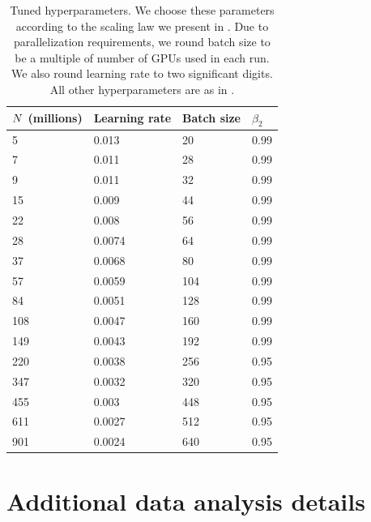 \documentclass{article}
\theoremstyle{plain}
\theoremstyle{definition}
\theoremstyle{remark}
\newcommand{\maybeSubscript}[1]{
  \ifthenelse{\equal{#1}{}}{}{_{#1}}%
}
\newcommand{\params}[1][]{N\maybeSubscript{#1}}
\begin{document}
\begin{table}
    \caption{Tuned hyperparameters. We choose these parameters according to the scaling law we present in . Due to parallelization requirements, we round batch size to be a multiple of number of GPUs used in each run. We also round learning rate to two significant digits. All other hyperparameters are as in .
    }
    \vspace{1em}

    \label{tab:hparams-tuned}
    \centering
\renewcommand{\arraystretch}{1.15}
\begin{tabular}{llll}
  \toprule
  $\params$ (millions) & Learning rate & Batch size & $\beta_2$ \\
  \midrule
  \num{5} & \num{0.013} & \num{20} & \num{0.99} \\
  \num{7} & \num{0.011} & \num{28} & \num{0.99} \\
  \num{9} & \num{0.011} & \num{32} & \num{0.99} \\
  \num{15} & \num{0.009} & \num{44} & \num{0.99} \\
  \num{22} & \num{0.008} & \num{56} & \num{0.99} \\
  \num{28} & \num{0.0074} & \num{64} & \num{0.99} \\
  \num{37} & \num{0.0068} & \num{80} & \num{0.99} \\
  \num{57} & \num{0.0059} & \num{104} & \num{0.99} \\
  \num{84} & \num{0.0051} & \num{128} & \num{0.99} \\
  \num{108} & \num{0.0047} & \num{160} & \num{0.99} \\
  \num{149} & \num{0.0043} & \num{192} & \num{0.99} \\
  \num{220} & \num{0.0038} & \num{256} & \num{0.95} \\
  \num{347} & \num{0.0032} & \num{320} & \num{0.95} \\
  \num{455} & \num{0.003} & \num{448} & \num{0.95} \\
  \num{611} & \num{0.0027} & \num{512} & \num{0.95} \\
  \num{901} & \num{0.0024} & \num{640} & \num{0.95} \\
  \bottomrule
\end{tabular}   \end{table}
  \vspace{1em}

\section{Additional data analysis details}\label{app:data-analysis}
\end{document}
